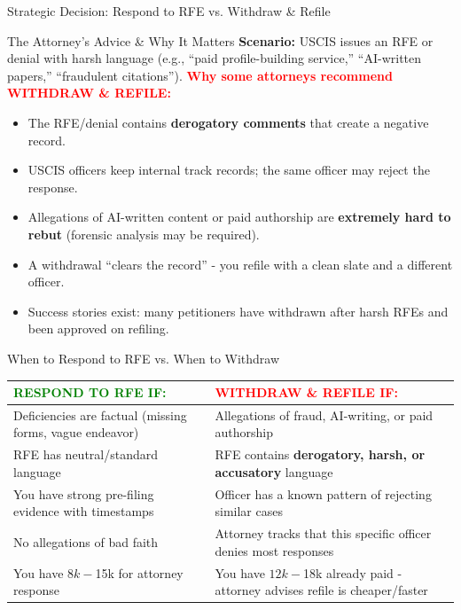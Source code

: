 \documentclass[11pt]{beamer}
\begin{document}
	\begin{frame}{Strategic Decision: Respond to RFE vs. Withdraw \& Refile}
		\scriptsize
		\begin{block}{The Attorney's Advice \& Why It Matters}
			\textbf{Scenario:} USCIS issues an RFE or denial with harsh language (e.g., ``paid profile-building service,'' ``AI-written papers,'' ``fraudulent citations'').
			\vspace{0.2cm}
			\textcolor{red}{\textbf{Why some attorneys recommend WITHDRAW \& REFILE:}}
			\begin{itemize}
				\item The RFE/denial contains \textbf{derogatory comments} that create a negative record.
				\item USCIS officers keep internal track records; the same officer may reject the response.
				\item Allegations of AI-written content or paid authorship are \textbf{extremely hard to rebut} (forensic analysis may be required).
				\item A withdrawal ``clears the record'' - you refile with a clean slate and a different officer.
				\item Success stories exist: many petitioners have withdrawn after harsh RFEs and been approved on refiling.
			\end{itemize}
		\end{block}
		
		\begin{block}{When to Respond to RFE vs. When to Withdraw}
			\centering
			\begin{tabular}{|p{4.5cm}|p{4.5cm}|}
				\hline
				\textcolor{green}{\textbf{RESPOND TO RFE IF:}} & \textcolor{red}{\textbf{WITHDRAW \& REFILE IF:}} \\
				\hline
				Deficiencies are factual (missing forms, vague endeavor) & Allegations of fraud, AI-writing, or paid authorship \\
				\hline
				RFE has neutral/standard language & RFE contains \textbf{derogatory, harsh, or accusatory} language \\
				\hline
				You have strong pre-filing evidence with timestamps & Officer has a known pattern of rejecting similar cases \\
				\hline
				No allegations of bad faith & Attorney tracks that this specific officer denies most responses \\
				\hline
				You have $8k-$15k for attorney response & You have $12k-$18k already paid - attorney advises refile is cheaper/faster \\
				\hline
			\end{tabular}
		\end{block}
	\end{frame}
	
\end{document}
